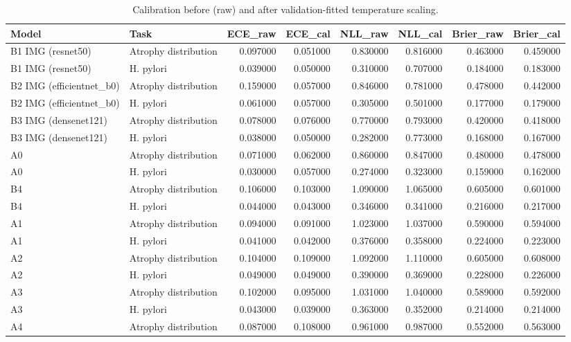 \begin{table}
\caption{Calibration before (raw) and after validation-fitted temperature scaling.}
\label{tab:table7a_calibration}
\begin{tabular}{llrrrrrr}
\toprule
Model & Task & ECE\_raw & ECE\_cal & NLL\_raw & NLL\_cal & Brier\_raw & Brier\_cal \\
\midrule
B1 IMG (resnet50) & Atrophy distribution & 0.097000 & 0.051000 & 0.830000 & 0.816000 & 0.463000 & 0.459000 \\
B1 IMG (resnet50) & H. pylori & 0.039000 & 0.050000 & 0.310000 & 0.707000 & 0.184000 & 0.183000 \\
B2 IMG (efficientnet\_b0) & Atrophy distribution & 0.159000 & 0.057000 & 0.846000 & 0.781000 & 0.478000 & 0.442000 \\
B2 IMG (efficientnet\_b0) & H. pylori & 0.061000 & 0.057000 & 0.305000 & 0.501000 & 0.177000 & 0.179000 \\
B3 IMG (densenet121) & Atrophy distribution & 0.078000 & 0.076000 & 0.770000 & 0.793000 & 0.420000 & 0.418000 \\
B3 IMG (densenet121) & H. pylori & 0.038000 & 0.050000 & 0.282000 & 0.773000 & 0.168000 & 0.167000 \\
A0 & Atrophy distribution & 0.071000 & 0.062000 & 0.860000 & 0.847000 & 0.480000 & 0.478000 \\
A0 & H. pylori & 0.030000 & 0.057000 & 0.274000 & 0.323000 & 0.159000 & 0.162000 \\
B4 & Atrophy distribution & 0.106000 & 0.103000 & 1.090000 & 1.065000 & 0.605000 & 0.601000 \\
B4 & H. pylori & 0.044000 & 0.043000 & 0.346000 & 0.341000 & 0.216000 & 0.217000 \\
A1 & Atrophy distribution & 0.094000 & 0.091000 & 1.023000 & 1.037000 & 0.590000 & 0.594000 \\
A1 & H. pylori & 0.041000 & 0.042000 & 0.376000 & 0.358000 & 0.224000 & 0.223000 \\
A2 & Atrophy distribution & 0.104000 & 0.109000 & 1.092000 & 1.110000 & 0.605000 & 0.608000 \\
A2 & H. pylori & 0.049000 & 0.049000 & 0.390000 & 0.369000 & 0.228000 & 0.226000 \\
A3 & Atrophy distribution & 0.102000 & 0.095000 & 1.031000 & 1.040000 & 0.589000 & 0.592000 \\
A3 & H. pylori & 0.043000 & 0.039000 & 0.363000 & 0.352000 & 0.214000 & 0.214000 \\
A4 & Atrophy distribution & 0.087000 & 0.108000 & 0.961000 & 0.987000 & 0.552000 & 0.563000 \\

\end{tabular}
\end{table}
